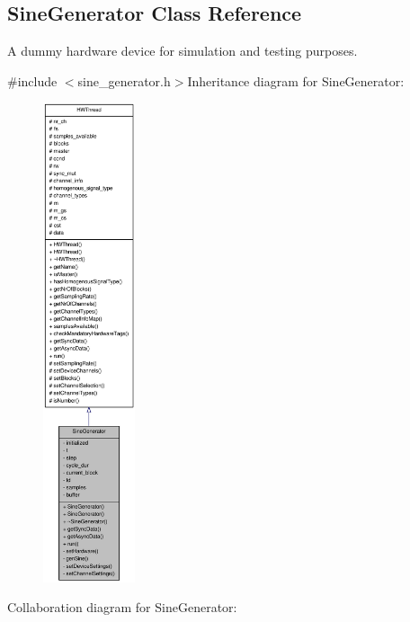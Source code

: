 \hypertarget{class_sine_generator}{
\subsection{SineGenerator Class Reference}
\label{class_sine_generator}
}


A dummy hardware device for simulation and testing purposes.  


{\ttfamily \#include $<$sine\_\-generator.h$>$}Inheritance diagram for SineGenerator:\nopagebreak
\begin{figure}[H]
\begin{center}
\leavevmode
\includegraphics[height=400pt]{class_sine_generator__inherit__graph}
\end{center}
\end{figure}
Collaboration diagram for SineGenerator:\nopagebreak
